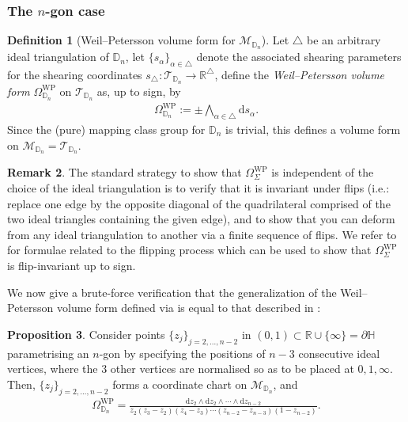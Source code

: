 \documentclass{amsart}
\newcommand{\HH}{\mathbb{H}}
\newcommand{\RR}{\mathbb{R}}
\theoremstyle{definition}
\newtheorem{proposition}{Proposition}[section]
\newtheorem{definition}[proposition]{Definition}
\newtheorem{remark}[proposition]{Remark}
\begin{document}
\subsubsection{The $n$-gon case}

\begin{definition}[Weil--Petersson volume form for $\mathcal{M}_{\mathbb{D}_n}$]
Let $\triangle$ be an arbitrary ideal triangulation of $\mathbb{D}_n$, let $\{s_\alpha\}_{\alpha\in\triangle}$ denote the associated shearing parameters for the shearing coordinates $s_\triangle:\mathcal{T}_{\mathbb{D}_n}\to\mathbb{R}^{\triangle}$, define the \emph{Weil--Petersson volume form} $\Omega^{\mathrm{WP}}_{\mathbb{D}_n}$ on $\mathcal{T}_{\mathbb{D}_n}$ as, up to sign, by
\begin{align}
\label{eq:vol-form-n-gon}  
\Omega^{\mathrm{WP}}_{\mathbb{D}_n} 
:= \pm \bigwedge_{\alpha\in\triangle}\mathrm{d}s_\alpha.
\end{align}
Since the (pure) mapping class group for $\mathbb{D}_n$ is trivial, this defines a volume form on $\mathcal{M}_{\mathbb{D}_n}=\mathcal{T}_{\mathbb{D}_n}$.
\end{definition}

\begin{remark}
The standard strategy to show that $\Omega^{\mathrm{WP}}_{\Sigma}$ is independent of the choice of the ideal triangulation is to verify that it is invariant under flips (i.e.: replace one edge by the opposite diagonal of the quadrilateral comprised of the two ideal triangles containing the given edge), and to show that you can deform from any ideal triangulation to another via a finite sequence of flips. We refer to \cite[Theorem~4.7]{pennerbook} for formulae related to the flipping process which can be used to show that $\Omega^{\mathrm{WP}}_{\Sigma}$ is flip-invariant up to sign.
\end{remark}


We now give a brute-force verification that the generalization of the Weil--Petersson volume form defined via  is equal to that described in \cite[Equation~{(6.9)}]{chekhov2024}:


\begin{proposition}
\label{prop:vol-form-n-gon}
Consider points $\{z_j\}_{j=2,\ldots,n-2}$ in $(0,1)\subset\RR\cup\{\infty\}=\partial\HH$ parametrising an $n$-gon by specifying the positions of $n-3$ consecutive ideal vertices, where the $3$ other vertices are normalised so as to be placed at $0,1,\infty$. Then, $\{z_j\}_{j=2,\ldots,n-2}$ forms a coordinate chart on $\mathcal{M}_{\mathbb{D}_n}$, and
\begin{align}
\Omega^{\mathrm{WP}}_{\mathbb{D}_n}
=
\frac{\mathrm{d}z_2\wedge \mathrm{d}z_2\wedge\cdots\wedge \mathrm{d}z_{n-2}}
{z_2(z_3-z_2)(z_4-z_3)\cdots (z_{n-2}-z_{n-3})(1-z_{n-2})}.
\label{eq:chekhovngoncase}
\end{align}

\end{proposition}
\end{document}
